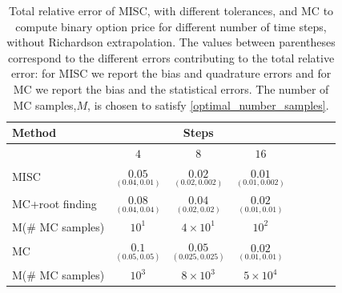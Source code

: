 \begin{table}[h!]
	\centering
	\begin{tabular}{l*{6}{c}r}
		\toprule[1.5pt]
	Method & & Steps  &     \\
	\hline
	        & $4$ & $8$ & $16$  \\
		\hline
		MISC   & $\underset{(0.04,0.01 )}{\mathbf{0.05}}$ & $\underset{(0.02,0.002)}{\mathbf{ 0.02}}$ & $\underset{(0.01,0.002)}{\mathbf{0.01}}$  \\
		\hline
		MC+root finding   &   $\underset{(0.04,0.04 )}{\mathbf{0.08}}$ & $\underset{(0.02,0.02)}{\mathbf{0.04}}$ & $\underset{(0.01,0.01)}{\mathbf{0.02}}$  \\	
			M(\# MC samples)   & $ 10^1$  & $4 \times 10^1$  & $  10^2$ \\	
		\hline
			MC     & $\underset{(0.05,0.05)}{\mathbf{0.1}}$ & $\underset{(0.025,0.025 )}{\mathbf{0.05}}$ & $\underset{(0.01,0.01 )}{\mathbf{0.02}}$  \\	
			M(\# MC samples)   & $ 10^3$  & $8 \times 10^3$  & $ 5 \times 10^4$ \\	
			\bottomrule[1.25pt]
	\end{tabular}
	\caption{Total relative error of MISC, with different tolerances, and MC to compute binary option price for different number of time steps, without Richardson extrapolation. The values between parentheses correspond to the different errors contributing to the total relative error: for MISC we report the bias and quadrature errors and for MC we report the bias and the statistical errors. The number of MC samples,$ M$, is chosen to satisfy \eqref{optimal_number_samples}.}
	\label{Total error of MISC and MC to compute Binary option price of the different tolerances for different number of time steps, without Richardson extrapolation. The numbers between parentheses are the corresponding absolute errors.}
\end{table}

